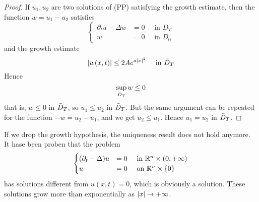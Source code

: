 \begin{ProofBox}
    \begin{proof}
        If $u_1,u_2$ are two solutions of (PP) satisfying the growth estimate, then the function $ w = u_1 - u_2$ satisfies 
        \begin{equation*}
            \begin{cases}
                \partial_t u - \Delta w &= 0 \quad \text{ in } D_T \\
                w &= 0 \quad \text{ in } D_0
            \end{cases}
        \end{equation*}
        and the growth estimate
        \begin{equation*}
            |w(x,t)| \leq 2 A e^{a |x|^2} \quad \text{ in } \Bar{D}_T
        \end{equation*}
        Hence
        \begin{equation*}
            \sup_{\Bar{D}_T} w \leq 0
        \end{equation*}
        that is, $w \leq 0$ in $\Bar{D}_T$, so $u_1 \leq u_2$ in $\Bar{D}_T$. But the same argument can be repeated for the function $- w = u_2 - u_1$, and we get $u_2 \leq u_1$. Hence $u_1=u_2$ in $\Bar{D}_T$. 
    \end{proof}
\end{ProofBox}
\begin{remark}
    If we drop the growth hypothesis, the uniqueness result does not hold anymore. \\
    It hase been proben that the problem
    \begin{equation*}
        \begin{cases}
            (\partial_t - \Delta) u &= 0 \quad \text{ in } \mathbb{R}^n \times (0,+\infty) \\
            u&= 0 \quad \text{ on } \mathbb{R}^n \times \{0\}
        \end{cases}
    \end{equation*}
    has solutions different from $u(x,t) = 0$, which is obviously a solution. These solutions grow more than exponentially as $|x| \rightarrow +\infty$. 
\end{remark}
